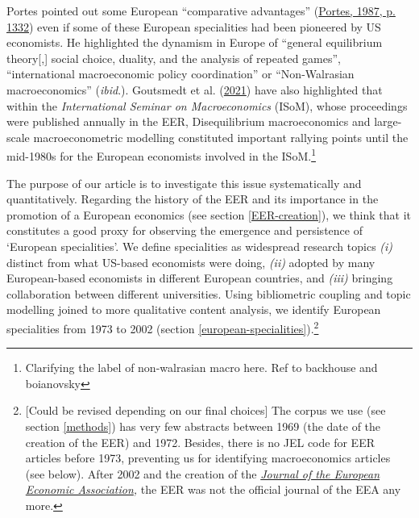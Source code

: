 \documentclass[]{elsarticle} %
\begin{document}
Portes pointed out some European ``comparative advantages''
(\protect\hyperlink{ref-portes1987}{Portes, 1987, p. 1332}) even if some
of these European specialities had been pioneered by US economists. He
highlighted the dynamism in Europe of ``general equilibrium
theory{[},{]} social choice, duality, and the analysis of repeated
games'', ``international macroeconomic policy coordination'' or
``Non-Walrasian macroeconomics'' (\emph{ibid}.). Goutsmedt et al.
(\protect\hyperlink{ref-goutsmedt2021}{2021}) have also highlighted that
within the \emph{International Seminar on Macroeconomics} (ISoM), whose
proceedings were published annually in the EER, Disequilibrium
macroeconomics and large-scale macroeconometric modelling constituted
important rallying points until the mid-1980s for the European
economists involved in the ISoM.\footnote{Clarifying the label of
  non-walrasian macro here. Ref to backhouse and boianovsky}

The purpose of our article is to investigate this issue systematically
and quantitatively. Regarding the history of the EER and its importance
in the promotion of a European economics (see section
\ref{EER-creation}), we think that it constitutes a good proxy for
observing the emergence and persistence of `European specialities'. We
define specialities as widespread research topics \emph{(i)} distinct
from what US-based economists were doing, \emph{(ii)} adopted by many
European-based economists in different European countries, and
\emph{(iii)} bringing collaboration between different universities.
Using bibliometric coupling and topic modelling joined to more
qualitative content analysis, we identify European specialities from
1973 to 2002 (section \ref{european-specialities}).\footnote{{[}Could be
  revised depending on our final choices{]} The corpus we use (see
  section \ref{methods}) has very few abstracts between 1969 (the date
  of the creation of the EER) and 1972. Besides, there is no JEL code
  for EER articles before 1973, preventing us for identifying
  macroeconomics articles (see below). After 2002 and the creation of
  the \href{https://academic.oup.com/jeea}{\emph{Journal of the European
  Economic Association}}\emph{,} the EER was not the official journal of
  the EEA any more.}
\end{document}
